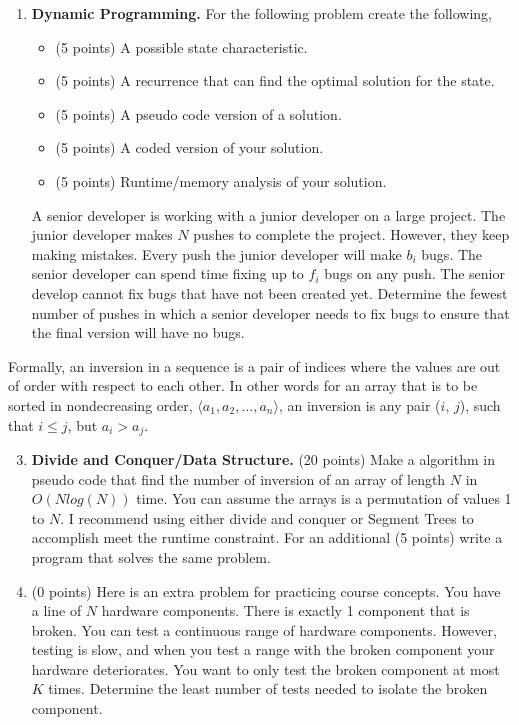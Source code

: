 \documentclass[12pt]{article}
\begin{document}
\begin{enumerate}
   	  \item \textbf{Dynamic Programming.} For the following problem create the following,
   	  \begin{itemize}
   	  	\item (5 points) A possible state characteristic.
   	  	\item (5 points) A recurrence that can find the optimal solution for the state.
   	  	\item (5 points) A pseudo code version of a solution.
   	  	\item (5 points) A coded version of your solution.
   	  	\item (5 points) Runtime/memory analysis of your solution.
   	  \end{itemize} 
   	  
   	  A senior developer is working with a junior developer on a large project. The junior developer makes $N$ pushes to complete the project. However, they keep making mistakes. Every push the junior developer will make $b_i$ bugs. The senior developer can spend time fixing up to $f_i$ bugs on any push. The senior develop cannot fix bugs that have not been created yet. Determine the fewest number of pushes in which a senior developer needs to fix bugs to ensure that the final version will have no bugs.
      
   \end{enumerate}
   Formally, an inversion in a sequence is a pair of indices where the values are out of order with respect to each other. In other words for an array that is to be sorted in nondecreasing order, $\langle a_1, a_2, \dots , a_n\rangle$, an inversion is any pair ($i$, $j$), such that $i \leq j$, but $a_i > a_j$.
   \begin{enumerate}
   	  \setcounter{enumi}{2}
      \item \textbf{Divide and Conquer/Data Structure.} (20 points) Make a algorithm in pseudo code that find the number of inversion of an array of length $N$ in $O(Nlog(N))$ time. You can assume the arrays is a permutation of values 1 to $N$. I recommend using either divide and conquer or Segment Trees to accomplish meet the runtime constraint. For an additional (5 points) write a program that solves the same problem.
   
   
   	  \item (0 points) Here is an extra problem for practicing course concepts. You have a line of $N$ hardware components. There is exactly 1 component that is broken. You can test a continuous range of hardware components. However, testing is slow, and when you test a range with the broken component your hardware deteriorates. You want to only test the broken component at most $K$ times. Determine the least number of tests needed to isolate the broken component.
   
   \end{enumerate}
   
\end{document}
